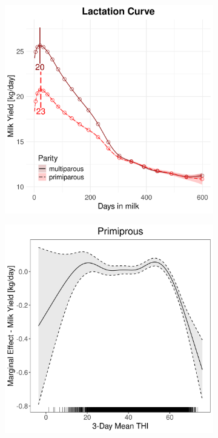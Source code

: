 \begin{figure}[H]
\begin{subfigure}[b]{0.45\textwidth}
        \includegraphics[width=\textwidth]{thesis/figures/models/milk/before2010/ob_milk_before2010/ob_milk_before2010_marginal_dim_milk_combined.png}
    \end{subfigure}
    \begin{subfigure}[b]{0.45\textwidth}
        \centering
        \includegraphics[width=\textwidth]{thesis/figures/models/milk/before2010/ob_milk_before2010/ob_milk_before2010_marginal_thi_milk_primi.png}

\end{subfigure}
\end{figure}
